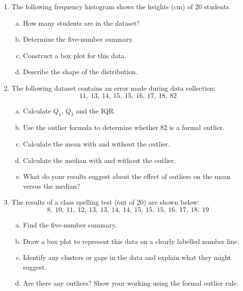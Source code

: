 \documentclass{article}
\begin{document}
\begin{enumerate}
  \item The following frequency histogram shows the heights (cm) of 20 students.
  \begin{center}
  \end{center}
  \begin{enumerate}[(a)]
    \item How many students are in the dataset?
    \item Determine the five-number summary.
    \item Construct a box plot for this data.
    \item Describe the shape of the distribution.
  \end{enumerate}

  \item The following dataset contains an error made during data collection:
  \[
    11,\ 13,\ 14,\ 15,\ 15,\ 16,\ 17,\ 18,\ 82
  \]
  \begin{enumerate}[(a)]
    \item Calculate $Q_1$, $Q_3$ and the IQR.
    \item Use the outlier formula to determine whether 82 is a formal outlier.
    \item Calculate the mean with and without the outlier.
    \item Calculate the median with and without the outlier.
    \item What do your results suggest about the effect of outliers on the mean versus the median?
  \end{enumerate}

  \item The results of a class spelling test (out of 20) are shown below:
  \[
    8,\ 10,\ 11,\ 12,\ 13,\ 13,\ 14,\ 14,\ 15,\ 15,\ 15,\ 16,\ 17,\ 18,\ 19
  \]
  \begin{enumerate}[(a)]
    \item Find the five-number summary.
    \item Draw a box plot to represent this data on a clearly labelled number line.
    \item Identify any clusters or gaps in the data and explain what they might suggest.
    \item Are there any outliers? Show your working using the formal outlier rule.
  \end{enumerate}


\end{enumerate}
\end{document}
